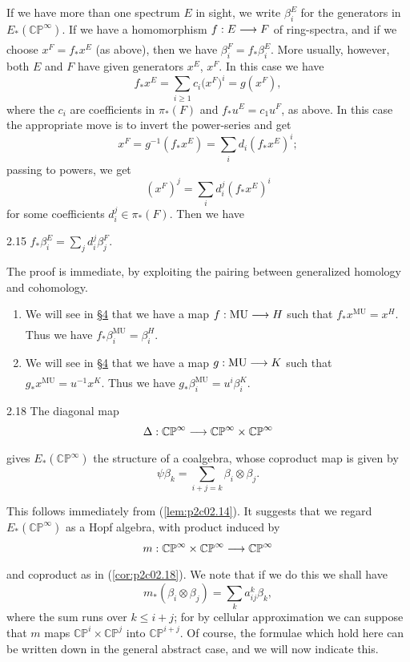 \documentclass[../main]{subfiles}
\begin{document}
If we have more than one spectrum $E$ in sight, we write $\beta_i^E$ for the generators in $E_\ast(\mathbb {CP}^\infty)$. If we have a homomorphism $f : E \lar{} F$ of ring-spectra, and if we choose $x^F = f_\ast x^E$ (as above), then we have $\beta_i^F = f_\ast \beta_i^E$. More usually, however, both $E$ and $F$ have given generators $x^E$, $x^F$. In this case we have \[f_\ast x^E = \sum_{i \ge 1} c_i \big(x^F\big)^i = g(x^F),\] where the $c_i$ are coefficients in $\pi_\ast(F)$ and $f_\ast u^E = c_1 u^F$, as above. In this case the appropriate move is to invert the power-series and get \[x^F = g^{-1}(f_\ast x^E) = \sum_i d_i (f_\ast x^E)^i;\] passing to powers, we get \[(x^F)^j = \sum_i d_i^j (f_\ast x^E)^i\] for some coefficients $d_i^j \in \pi_\ast(F)$. Then we have

\begin{customlemma}{2.15}
\label{lem:p2c02.15} $\displaystyle f_\ast \beta_i^E = \sum_j d_i^j \beta_j^F.$
\end{customlemma}

The proof is immediate, by exploiting the pairing between generalized homology and cohomology.

\begin{examples}
\begin{enumerate}
    \item[(2.16)] We will see in \hyperref[sec:p2c4]{\S 4} that we have a map $f : \mathrm{MU} \lar{} H$ such that $f_\ast x^{\mathrm{MU}} = x^H$. Thus we have $f_\ast \beta_i^{\mathrm{MU}} = \beta_i^H$.
    \item[(2.17)] We will see in \hyperref[sec:p2c4]{\S 4} that we have a map $g : \mathrm{MU} \lar{} K$ such that $g_\ast x^{\mathrm{MU}} = u^{-1} x^K$. Thus we have $g_\ast \beta_i^{\mathrm{MU}} = u^i \beta_i^K$.
\end{enumerate}
\end{examples}

\begin{customcor}{2.18}
\label{cor:p2c02.18}
The diagonal map \[\Delta : \mathbb {CP}^\infty \lar{} \mathbb {CP}^\infty \times \mathbb {CP}^\infty\] gives $E_\ast(\mathbb {CP}^\infty)$ the structure of a coalgebra, whose coproduct map is given by \[\psi \beta_k = \sum_{i + j = k} \beta_i \otimes \beta_j.\]
\end{customcor}

This follows immediately from (\ref{lem:p2c02.14}). It suggests that we regard $E_\ast(\mathbb {CP}^\infty)$ as a Hopf algebra, with product induced by \[m : \mathbb {CP}^\infty \times \mathbb {CP}^\infty \lar{} \mathbb {CP}^\infty\] and coproduct as in (\ref{cor:p2c02.18}). We note that if we do this we shall have \[m_\ast(\beta_i \otimes \beta_j) = \sum_k a_{ij}^k \beta_k,\] where the sum runs over $k \le i + j$; for by cellular approximation we can suppose that $m$ maps $\mathbb {CP}^i \times \mathbb {CP}^j$ into $\mathbb {CP}^{i + j}$. Of course, the formulae which hold here can be written down in the general abstract case, and we will now indicate this.  
\end{document}
